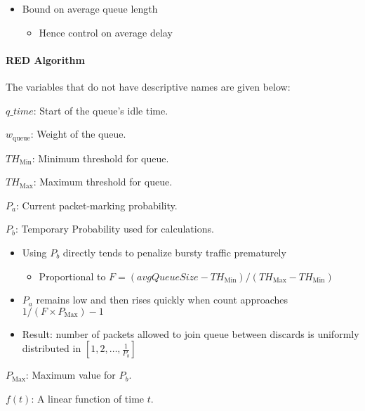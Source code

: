 \begin{definition}
\begin{itemize}[noitemsep]
\item Bound on average queue length
  \begin{itemize}[noitemsep]
  \item Hence control on average delay
  \end{itemize}
\end{itemize}

\paragraph{RED Algorithm}\label{par:Random_Early_Discard_Algorithm}
The variables that do not have descriptive names are given below:
\begin{description}[noitemsep]
\item $q\_time$: Start of the queue's idle time.
\item $w_{\mathrm{queue}}$: Weight of the queue.
\item $TH_{\mathrm{Min}}$: Minimum threshold for queue.
\item $TH_{\mathrm{Max}}$: Maximum threshold for queue.
\item $P_{a}$: Current packet-marking probability.
\item $P_{b}$: Temporary Probability used for calculations.
  \begin{itemize}[noitemsep]
  \item Using $P_{b}$ directly tends to penalize bursty traffic prematurely
    \begin{itemize}[noitemsep]
    \item Proportional to $F=(avgQueueSize-TH_{\mathrm{Min}})/(TH_{\mathrm{Max}}-TH_{\mathrm{Min}})$
    \end{itemize}
\item $P_{a}$ remains low and then rises quickly when count approaches $1/(F \times P_{\mathrm{Max}})-1$
\item Result: number of packets allowed to join queue between discards is uniformly distributed in $\left[1, 2, \ldots, \frac{1}{P_{b}} \right]$
  \end{itemize}
\item $P_{\mathrm{Max}}$: Maximum value for $P_{b}$.
\item $f(t)$: A linear function of time $t$.
\end{description}

\begin{algorithm}[H]
  \DontPrintSemicolon{}
  \BlankLine{}


\end{algorithm}
\end{definition}
